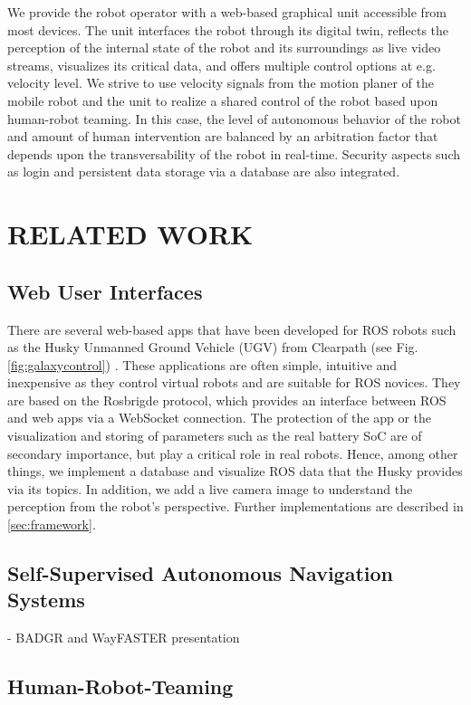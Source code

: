 \documentclass[letterpaper, 10 pt, conference]{ieeeconf}  %
\begin{document}
We  provide the robot operator with a web-based graphical unit accessible from most devices. The unit interfaces the robot through its digital twin, reflects the perception of the internal state of the robot and its surroundings as live video streams, visualizes its critical data, and offers multiple control options at e.g. velocity level. We strive to use  velocity signals from the motion planer of the mobile robot and the unit to realize a shared control \cite{phri} of the robot based upon human-robot teaming. In this case, the level of autonomous  behavior of the robot and amount of human intervention are  balanced by an arbitration factor that depends upon the transversability of the robot in real-time. Security aspects such as login and persistent data storage via a database are also integrated. 

\section{RELATED WORK}
\subsection{Web User Interfaces}
There are several web-based apps that have been developed for ROS robots such as the Husky Unmanned Ground Vehicle (UGV) from Clearpath (see Fig.\ref{fig:galaxycontrol}) \cite{husky}. These applications are often simple, intuitive and inexpensive as they control virtual robots and are suitable for ROS novices.
They are based on the Rosbrigde protocol, which provides an interface between ROS and web apps via a WebSocket connection.\cite{kapic,dinodi,rosbridgeOkState,rosbridgeSuite}
The protection of the app or the visualization and storing of parameters such as the real battery SoC are of secondary importance, but play a critical role in real robots.
Hence, among other things, we implement a database and visualize ROS data that the Husky provides via its topics. In addition, we add a live camera image to understand the perception from the robot's perspective. Further implementations are described in \ref{sec:framework}.

\subsection{Self-Supervised Autonomous Navigation Systems}
- BADGR and WayFASTER presentation
\subsection{Human-Robot-Teaming}
\end{document}
